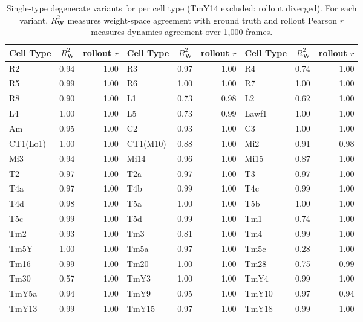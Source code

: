 \documentclass{article}
\begin{document}
\begin{table}[ht!]
\centering\scriptsize
\begin{tabular}{lrr@{\quad}lrr@{\quad}lrr}
\toprule
Cell Type & $R^2_{\mathbf{W}}$ & rollout $r$ &Cell Type & $R^2_{\mathbf{W}}$ & rollout $r$ & Cell Type & $R^2_{\mathbf{W}}$ & rollout $r$ \\
\midrule
R2         & 0.94 & 1.00 & R3         & 0.97 & 1.00 & R4         & 0.74 & 1.00 \\
R5         & 0.99 & 1.00 & R6         & 1.00 & 1.00 & R7         & 1.00 & 1.00 \\
R8         & 0.90 & 1.00 & L1         & 0.73 & 0.98 & L2         & 0.62 & 1.00 \\
L4         & 1.00 & 1.00 & L5         & 0.73 & 0.99 & Lawf1      & 1.00 & 1.00 \\
Am         & 0.95 & 1.00 & C2         & 0.93 & 1.00 & C3         & 1.00 & 1.00 \\
CT1(Lo1)   & 1.00 & 1.00 & CT1(M10)   & 0.88 & 1.00 & Mi2        & 0.91 & 0.98 \\
Mi3        & 0.94 & 1.00 & Mi14       & 0.96 & 1.00 & Mi15       & 0.87 & 1.00 \\
T2         & 0.97 & 1.00 & T2a        & 0.97 & 1.00 & T3         & 0.97 & 1.00 \\
T4a        & 0.97 & 1.00 & T4b        & 0.99 & 1.00 & T4c        & 0.99 & 1.00 \\
T4d        & 0.98 & 1.00 & T5a        & 1.00 & 1.00 & T5b        & 1.00 & 1.00 \\
T5c        & 0.99 & 1.00 & T5d        & 0.99 & 1.00 & Tm1        & 0.74 & 1.00 \\
Tm2        & 0.93 & 1.00 & Tm3        & 0.81 & 1.00 & Tm4        & 0.99 & 1.00 \\
Tm5Y       & 1.00 & 1.00 & Tm5a       & 0.97 & 1.00 & Tm5c       & 0.28 & 1.00 \\
Tm16       & 0.99 & 1.00 & Tm20       & 1.00 & 1.00 & Tm28       & 0.75 & 0.99 \\
Tm30       & 0.57 & 1.00 & TmY3       & 1.00 & 1.00 & TmY4       & 0.99 & 1.00 \\
TmY5a      & 0.94 & 1.00 & TmY9       & 0.95 & 1.00 & TmY10      & 0.97 & 0.94 \\
TmY13      & 0.99 & 1.00 & TmY15      & 0.97 & 1.00 & TmY18      & 0.99 & 1.00 \\
\bottomrule
\end{tabular}
\caption{Single-type degenerate variants for per cell type (TmY14
excluded: rollout diverged). For each variant, $R^2_{\mathbf{W}}$ measures
weight-space agreement with ground truth and rollout Pearson $r$ measures
dynamics agreement over 1{,}000 frames.}
\label{tab:lambda_8}
\end{table}
\end{document}

